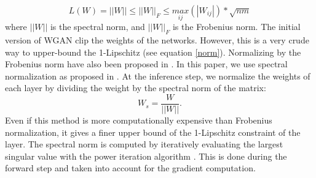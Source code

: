 \begin{equation}
\label{norm}
    L(W)=||W|| \leq ||W ||_F \leq \underset{ij}{max}(|W_{ij}|)*\sqrt{nm}
\end{equation}
where $|| W||$ is the spectral norm, and  $|| W||_F$ is the Frobenius norm. The initial version of WGAN \cite{Arjovsky2017} clip the weights of the networks. However, this is a very crude way to upper-bound the 1-Lipschitz (see equation \ref{norm}). Normalizing by the Frobenius norm have also been proposed in  \cite{SalimansK16}. In this paper, we use spectral normalization as proposed in \cite{Miyato2018SpectralNF}. At the inference step, we normalize the weights of each layer by dividing the weight by the spectral norm of the matrix:
$$W_s=\frac{W}{||W||}.$$
Even if this method is more computationally expensive than Frobenius normalization, it gives a finer upper bound of the 1-Lipschitz constraint of the layer.
The spectral norm is computed by iteratively evaluating the largest singular value with the power iteration algorithm \cite{GOLUB200035}. This is done during the forward step and taken into account for the gradient computation.



